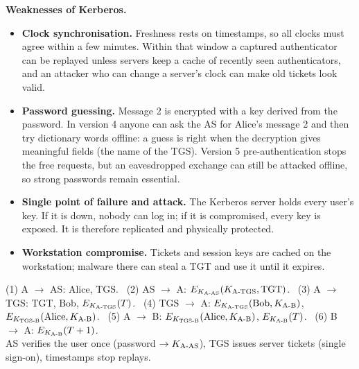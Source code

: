 \textbf{Weaknesses of Kerberos.}
\begin{itemize}
  \item \textbf{Clock synchronisation.} Freshness rests on timestamps, so all clocks must agree within a few minutes. Within that window a captured authenticator can be replayed unless servers keep a cache of recently seen authenticators, and an attacker who can change a server's clock can make old tickets look valid.
  \item \textbf{Password guessing.} Message 2 is encrypted with a key derived from the password. In version 4 anyone can ask the AS for Alice's message 2 and then try dictionary words offline: a guess is right when the decryption gives meaningful fields (the name of the TGS). Version 5 pre-authentication stops the free requests, but an eavesdropped exchange can still be attacked offline, so strong passwords remain essential.
  \item \textbf{Single point of failure and attack.} The Kerberos server holds every user's key. If it is down, nobody can log in; if it is compromised, every key is exposed. It is therefore replicated and physically protected.
  \item \textbf{Workstation compromise.} Tickets and session keys are cached on the workstation; malware there can steal a TGT and use it until it expires.
\end{itemize}

\begin{mustknow}
(1) A $\to$ AS: Alice, TGS. \ (2) AS $\to$ A: $E_{K_{\text{A-AS}}}(K_{\text{A-TGS}}, \text{TGT})$. \ (3) A $\to$ TGS: TGT, Bob, $E_{K_{\text{A-TGS}}}(T)$. \ (4) TGS $\to$ A: $E_{K_{\text{A-TGS}}}(\text{Bob}, K_{\text{A-B}})$, $E_{K_{\text{TGS-B}}}(\text{Alice}, K_{\text{A-B}})$. \ (5) A $\to$ B: $E_{K_{\text{TGS-B}}}(\text{Alice}, K_{\text{A-B}})$, $E_{K_{\text{A-B}}}(T)$. \ (6) B $\to$ A: $E_{K_{\text{A-B}}}(T + 1)$.\\
AS verifies the user once (password $\to K_{\text{A-AS}}$), TGS issues server tickets (single sign-on), timestamps stop replays.
\end{mustknow}

